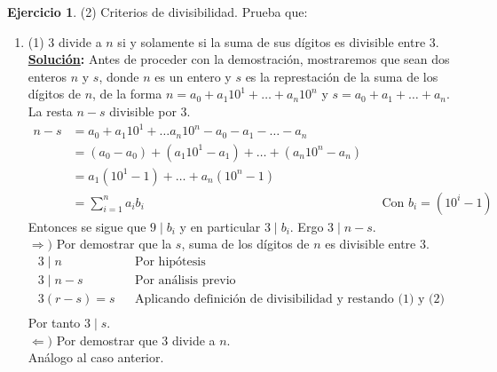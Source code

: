 \documentclass[11pt,letterpaper]{article}
\theoremstyle{definition}\newtheorem{p}{Ejercicio}
\newcommand{\sol}{\textbf{\underline{Solución}: }} %
\begin{document}
\begin{p}(2)
Criterios de divisibilidad. Prueba que:

\begin{enumerate}
    \item(1) 3 divide a $n$ si y solamente si la suma de sus d\'igitos es divisible entre 3.\\
    \sol Antes de proceder con la demostración, mostraremos que sean dos enteros $n$ y $s$,
    donde $n$ es un entero y $s$ es la represtación de la suma de los dígitos de $n$, de la 
    forma $n = a_0 + a_1 10^1 + \ldots + a_n 10^n$ y $s = a_0 + a_1 + \ldots + a_n$. La resta $n-s$
    divisible por $3$.
    \begin{align*}
        n - s &= a_0 + a_1 10^1 + \ldots a_n 10^n - a_0 - a_1 - \ldots - a_n\\
              &= (a_0 - a_0) + (a_1 10^1 - a_1) + \ldots + (a_n 10^n - a_n)\\
              &= a_1(10^1 - 1) + \ldots + a_n(10^n - 1)\\
              &= \sum_{i=1}^{n} a_i b_i && \text{Con $b_i = (10^i - 1)$}
    \end{align*}
    Entonces se sigue que $9 \mid b_i$ y en particular $3 \mid b_i$. Ergo $3 \mid n-s$.\\
    $\Longrightarrow) $ Por demostrar que la $s$, suma de los dígitos de $n$ es divisible entre $3$.
    \begin{align*}
        3 \mid n && \tag{1} \text{Por hipótesis}\\
        3 \mid n - s && \tag{2} \text{Por análisis previo}\\
        3(r-s) = s && \text{Aplicando definición de divisibilidad y restando (1) y (2)}\\
    \end{align*}
    Por tanto $3 \mid s$.\\
    $\Longleftarrow) $ Por demostrar que 3 divide a $n$.\\
    Análogo al caso anterior.


\end{enumerate}
\end{p}
\end{document}

